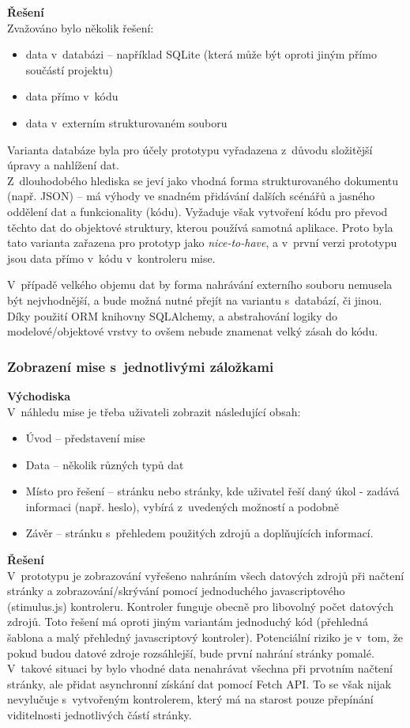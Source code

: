 	\textbf{Řešení}\\
	Zvažováno bylo několik řešení:
	
	\begin{itemize}
		\item data v~databázi -- například SQLite (která může být oproti jiným přímo součástí projektu)
		\item data přímo v~kódu
		\item data v~externím strukturovaném souboru
	\end{itemize}

	Varianta databáze byla pro účely prototypu vyřadazena z~důvodu složitější úpravy a nahlížení dat. \\
	Z~dlouhodobého hlediska se jeví jako vhodná forma strukturovaného dokumentu (např. JSON) -- má výhody ve snadném přidávání dalších scénářů a jasného oddělení dat a funkcionality (kódu). Vyžaduje však vytvoření kódu pro převod těchto dat do objektové struktury, kterou používá samotná aplikace.
	Proto byla tato varianta zařazena pro prototyp jako \textit{nice-to-have}, a v~první verzi prototypu jsou data přímo v~kódu v~kontroleru mise.

	V~případě velkého objemu dat by forma nahrávání externího souboru nemusela být nejvhodnější, a bude možná nutné přejít na variantu s~databází, či jinou. Díky použití ORM knihovny SQLAlchemy, a abstrahování logiky do modelové/objektové vrstvy to ovšem nebude znamenat velký zásah do kódu. 

\subsubsection*{Zobrazení mise s~jednotlivými záložkami}
	\textbf{Východiska}\\
	V~náhledu mise je třeba uživateli zobrazit následující obsah:
	
	\begin{itemize}
		\item Úvod -- představení mise
		\item Data -- několik různých typů dat
		\item Místo pro řešení -- stránku nebo stránky, kde uživatel řeší daný úkol - zadává informaci (např. heslo), vybírá z~uvedených možností a podobně
		\item Závěr -- stránku s~přehledem použitých zdrojů a doplňujících informací. 
	\end{itemize}	

	\textbf{Řešení}\\
	V~prototypu je zobrazování vyřešeno nahráním všech datových zdrojů při načtení stránky a zobrazování/skrývání pomocí jednoduchého javascriptového (stimulus.js) kontroleru. Kontroler funguje obecně pro libovolný počet datových zdrojů.
	Toto řešení má oproti jiným variantám jednoduchý kód (přehledná šablona a malý přehledný javascriptový kontroler).
	Potenciální riziko je v~tom, že pokud budou datové zdroje rozsáhlejší, bude první nahrání stránky pomalé. V~takové situaci by bylo vhodné data nenahrávat všechna při prvotním načtení stránky, ale přidat asynchronní získání dat pomocí Fetch API. To se však nijak nevylučuje s~vytvořeným kontrolerem, který má na starost pouze přepínání viditelnosti jednotlivých částí stránky.

